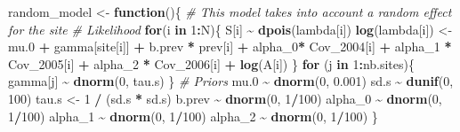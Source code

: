 \documentclass[
]{article}
\newenvironment{Shaded}{\begin{snugshade}}{\end{snugshade}}
\newcommand{\CommentTok}[1]{\textcolor[rgb]{0.56,0.35,0.01}{\textit{#1}}}
\newcommand{\ControlFlowTok}[1]{\textcolor[rgb]{0.13,0.29,0.53}{\textbf{#1}}}
\newcommand{\DecValTok}[1]{\textcolor[rgb]{0.00,0.00,0.81}{#1}}
\newcommand{\FloatTok}[1]{\textcolor[rgb]{0.00,0.00,0.81}{#1}}
\newcommand{\FunctionTok}[1]{\textcolor[rgb]{0.13,0.29,0.53}{\textbf{#1}}}
\newcommand{\NormalTok}[1]{#1}
\newcommand{\OtherTok}[1]{\textcolor[rgb]{0.56,0.35,0.01}{#1}}
\newcommand{\SpecialCharTok}[1]{\textcolor[rgb]{0.81,0.36,0.00}{\textbf{#1}}}
\begin{document}
\begin{Shaded}
\begin{Highlighting}[]
\NormalTok{random\_model }\OtherTok{\textless{}{-}} \ControlFlowTok{function}\NormalTok{()\{}
  \CommentTok{\# This model takes into account a random effect for the site}
  \CommentTok{\# Likelihood}
  \ControlFlowTok{for}\NormalTok{(i }\ControlFlowTok{in} \DecValTok{1}\SpecialCharTok{:}\NormalTok{N)\{}
\NormalTok{    S[i] }\SpecialCharTok{\textasciitilde{}} \FunctionTok{dpois}\NormalTok{(lambda[i])}
    \FunctionTok{log}\NormalTok{(lambda[i]) }\OtherTok{\textless{}{-}}\NormalTok{ mu}\FloatTok{.0} \SpecialCharTok{+}\NormalTok{ gamma[site[i]] }\SpecialCharTok{+}\NormalTok{ b.prev }\SpecialCharTok{*}\NormalTok{ prev[i] }\SpecialCharTok{+}\NormalTok{ alpha\_0}\SpecialCharTok{*}\NormalTok{ Cov\_2004[i] }\SpecialCharTok{+}\NormalTok{ alpha\_1 }\SpecialCharTok{*}\NormalTok{ Cov\_2005[i] }\SpecialCharTok{+}\NormalTok{ alpha\_2 }\SpecialCharTok{*}\NormalTok{ Cov\_2006[i] }\SpecialCharTok{+} \FunctionTok{log}\NormalTok{(A[i])}
\NormalTok{  \}}
  \ControlFlowTok{for}\NormalTok{ (j }\ControlFlowTok{in} \DecValTok{1}\SpecialCharTok{:}\NormalTok{nb.sites)\{}
\NormalTok{    gamma[j] }\SpecialCharTok{\textasciitilde{}} \FunctionTok{dnorm}\NormalTok{(}\DecValTok{0}\NormalTok{, tau.s)}
\NormalTok{  \}}
  \CommentTok{\# Priors}
\NormalTok{  mu}\FloatTok{.0} \SpecialCharTok{\textasciitilde{}} \FunctionTok{dnorm}\NormalTok{(}\DecValTok{0}\NormalTok{, }\FloatTok{0.001}\NormalTok{)}
\NormalTok{  sd.s }\SpecialCharTok{\textasciitilde{}} \FunctionTok{dunif}\NormalTok{(}\DecValTok{0}\NormalTok{, }\DecValTok{100}\NormalTok{)}
\NormalTok{  tau.s }\OtherTok{\textless{}{-}} \DecValTok{1} \SpecialCharTok{/}\NormalTok{ (sd.s }\SpecialCharTok{*}\NormalTok{ sd.s)}
\NormalTok{  b.prev }\SpecialCharTok{\textasciitilde{}} \FunctionTok{dnorm}\NormalTok{(}\DecValTok{0}\NormalTok{, }\DecValTok{1}\SpecialCharTok{/}\DecValTok{100}\NormalTok{)}
\NormalTok{  alpha\_0 }\SpecialCharTok{\textasciitilde{}} \FunctionTok{dnorm}\NormalTok{(}\DecValTok{0}\NormalTok{, }\DecValTok{1}\SpecialCharTok{/}\DecValTok{100}\NormalTok{)}
\NormalTok{  alpha\_1 }\SpecialCharTok{\textasciitilde{}} \FunctionTok{dnorm}\NormalTok{(}\DecValTok{0}\NormalTok{, }\DecValTok{1}\SpecialCharTok{/}\DecValTok{100}\NormalTok{)}
\NormalTok{  alpha\_2 }\SpecialCharTok{\textasciitilde{}} \FunctionTok{dnorm}\NormalTok{(}\DecValTok{0}\NormalTok{, }\DecValTok{1}\SpecialCharTok{/}\DecValTok{100}\NormalTok{)}
\NormalTok{\} }


\end{Highlighting}
\end{Shaded}
\end{document}
